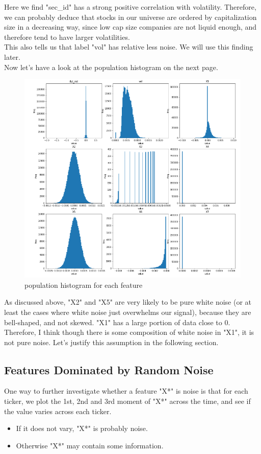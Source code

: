 \documentclass[onecolumn]{article}
\begin{document}
\noindent Here we find "sec\_id" has a strong positive correlation with volatility. Therefore, we can probably deduce that stocks in our universe are ordered by capitalization size in a decreasing way, since low cap size companies are not liquid enough, and therefore tend to have larger volatilities.\\
\indent This also tells us that label "vol" has relative less noise. We will use this finding later.\\
\indent Now let's have a look at the population histogram on the next page.
\begin{figure}[ht]
\centering
\includegraphics[scale=1]{pop_hist.PNG}
\caption{population histogram for each feature}
\label{fig:label}
\end{figure}

As discussed above, "X2" and "X5" are very likely to be pure white noise (or at least the cases where white noise just overwhelms our signal), because they are bell-shaped, and not skewed. "X1" has a large portion of data close to 0. Therefore, I think though there is some composition of white noise in "X1", it is not pure noise. Let's justify this assumption in the following section.

\subsection{Features Dominated by Random Noise}
\indent One way to further investigate whether a feature "X*" is noise is that for each ticker, we plot the 1st, 2nd and 3rd moment of "X*" across the time, and see if the value varies across each ticker.
\begin{itemize}
    \item If it does not vary, "X*" is probably noise.
    \item Otherwise "X*" may contain some information.
\end{itemize}
\end{document}
